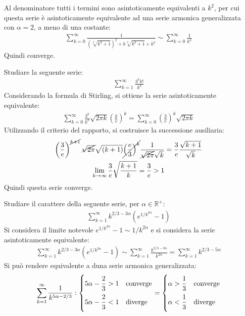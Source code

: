 \documentclass{article}
\numberwithin{equation}{subsection}
\begin{document}
Al denominatore tutti i termini sono asintoticamente equivalenti a $k^2$, per cui questa serie è asintoticamente equivalente ad una serie armonica generalizzata con $\alpha=2$, a meno di una costante:
\begin{gather*}
    \displaystyle\sum_{k=0}^\infty\frac{1}{\left(\sqrt[3]{k^3+1}\right)^2+k\sqrt[3]{k^3+1}+k^2}
    \sim\sum_{k=0}^\infty\frac{1}{k^2}
\end{gather*} 
Quindi converge. 


Studiare la seguente serie:
\begin{gather*}
    \displaystyle\sum_{k=1}^\infty\frac{3^kk!}{k^k}
\end{gather*}
Considerando la formula di Stirling, si ottiene la serie asintoticamente equivalente:
\begin{gather*}
    \displaystyle\sum_{k=0}^\infty\frac{3^k}{k^k}\sqrt{2\pi k}\left(\frac{k}{e}\right)^k=\sum_{k=0}^\infty\left(\frac{3}{e}\right)^k\sqrt{2\pi k}
\end{gather*}
Utilizzando il criterio del rapporto, si costruisce la successione ausiliaria: 
\begin{gather*}
    \displaystyle\left(\frac{3}{e}\right)^{\cancel{k+1}}\cancel{\sqrt{2\pi}} \sqrt{(k+1)}\cancel{\left(\frac{e}{3}\right)^k}\frac{1}{\cancel{\sqrt{2\pi}} \sqrt{k}}=
    \frac{3}{e}\frac{\sqrt{k+1}}{\sqrt{k}}\\
    \lim_{k\to\infty}\frac{3}{e}\sqrt{\frac{k+1}{k}}=\frac{3}{e}>1
\end{gather*}
Quindi questa serie converge. 


Studiare il carattere della seguente serie, per $\alpha\in\mathbb{R}^+$:
\begin{gather*}
    \displaystyle\sum_{k=1}^\infty k^{2/3-3\alpha}\left(e^{1/k^{2\alpha}}-1\right)
\end{gather*}
Si considera il limite notevole $e^{1/k^{2\alpha}}-1\sim1/k^{2\alpha}$ e si considera la serie asintoticamente equivalente:
\begin{gather*}
    \displaystyle\sum_{k=1}^\infty k^{2/3-3\alpha}\left(e^{1/k^{2\alpha}}-1\right)\sim
    \displaystyle\sum_{k=1}^\infty \frac{k^{2/3-3\alpha}}{k^{2\alpha}}=\sum_{k=1}^\infty k^{2/3-5\alpha}
\end{gather*}
Si può rendere equivalente a duna serie armonica generalizzata:
\begin{gather*}
    \displaystyle\sum_{k=1}^\infty\frac{1}{k^{5\alpha-2/3}}:\begin{cases}
        5\alpha-\displaystyle\frac{\strut 2}{\strut 3}>1 &\mbox{converge}\\
        5\alpha-\displaystyle\frac{\strut 2}{\strut 3}<1 &\mbox{diverge}
    \end{cases}=\begin{cases}
        \alpha>\displaystyle\frac{\strut 1}{\strut 3} &\mbox{converge}\\
        \alpha<\displaystyle\frac{\strut 1}{\strut 3} &\mbox{diverge}
    \end{cases}
\end{gather*}
\end{document}
